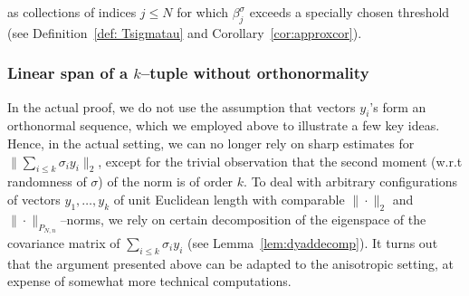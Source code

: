 \documentclass[11pt]{amsart}
\theoremstyle{definition}
\theoremstyle{plain}
\begin{document}
as collections of indices $j\leq N$ for which
$\beta^\sigma_j$ exceeds a specially chosen threshold
(see Definition~\ref{def: Tsigmatau} and Corollary~\ref{cor:approxcor}).



\subsubsection{Linear span of a $k$--tuple without orthonormality}
In the actual proof, we do not use the assumption
that vectors $y_i$'s form an orthonormal sequence,
which we employed above to illustrate a few key ideas.
Hence, in the actual setting, we can no longer rely on sharp estimates for 
$\|\sum_{i\leq k}\sigma_i y_i\|_2$, except
for the trivial observation that the second moment (w.r.t
randomness of $\sigma$) of the norm is of order $k$.
To deal with arbitrary 
configurations of vectors $y_1,\dots,y_k$ of unit Euclidean length
with comparable $\|\cdot\|_2$ and $\|\cdot\|_{P_{N,n}}$--norms,
we rely on certain decomposition of the eigenspace
of the covariance matrix of $\sum_{i\leq k}\sigma_i y_i$ (see Lemma~\ref{lem:dyaddecomp}).
It turns out that the argument presented above can be
adapted to the anisotropic setting, at expense of somewhat
more technical computations.
\end{document}
